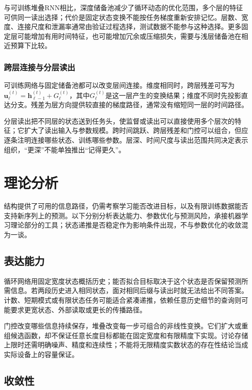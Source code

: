 与可训练堆叠RNN相比，深度储备池减少了循环动态的优化范围，多个层的特征可供同一读出选择；代价是固定状态变换不能按任务梯度重新安排记忆。层数、宽度、连接尺度和泄漏率通常由验证过程选择，测试数据不能参与这种选择。更多固定层可能增加有用时间特征，也可能增加冗余或压缩损失，需要与浅层储备池在相近预算下比较。

\subsubsection{跨层连接与分层读出}
\label{sec:rnn-depth-connections}

可训练网络与固定储备池都可以改变层间连接。维度相同时，跨层残差可写为$\bm u_\ell^{(t)}=\bm h_{\ell-1}^{(t)}+G_\ell^{(t)}$，其中$G_\ell^{(t)}$是这一层产生的变换结果；维度不同时先投影直达分支。残差为层方向提供较直接的梯度路径，通常没有缩短同一层的时间路径。

分层读出把不同层的状态送到任务头，使监督或读出可以直接使用多个层次的特征；它扩大了读出输入与参数规模。跨时间跳跃、跨层残差和门控可以组合，但应逐条注明连接哪些状态、训练哪些参数。层深、时间尺度与读出范围共同决定表示组织，“更深”不能单独推出“记得更久”。

\section{理论分析}
\label{sec:rnn-theory}

结构提供了可用的信息路径，仍需考察学习能否改进目标，以及有限训练数据能否支持新序列上的预测。以下分别分析表达能力、参数优化与预测风险，承接机器学习理论部分的工具；状态递推是否稳定作为影响条件出现，不与参数优化的收敛混为一谈。

\subsection{表达能力}
\label{sec:rnn-expressivity}

循环网络用固定宽度状态概括历史；能否拟合目标取决于这个状态是否保留预测所需信息。若两段历史进入相同状态，面对相同后缀与读出时就无法给出不同答案。计数、短期模式或有限状态任务可能适合紧凑递推，依赖任意历史细节的查询则可能要求更宽状态、外部读取或更长的传播路径。

门控改变哪些信息持续保存，堆叠改变每一步可组合的非线性变换。它们扩大或重组候选函数，却不保证任意长度目标都能在固定宽度和有限精度下实现。讨论存储上限时还需明确噪声、精度和连续性；不能将无限精度实数状态的存在性结论当成实际设备上的容量保证。

\subsection{收敛性}
\label{sec:rnn-convergence}

